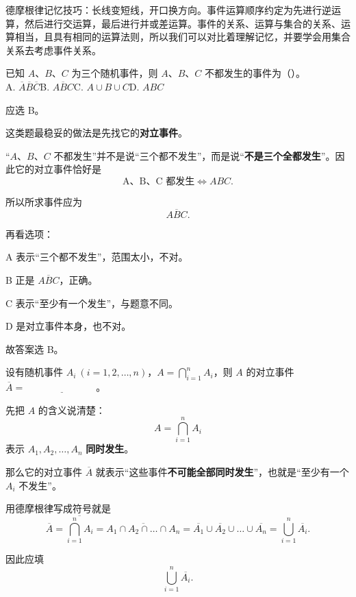 ﻿\documentclass[lang=cn,11pt]{elegantbook}
\begin{document}
\begin{note}
德摩根律记忆技巧：长线变短线，开口换方向。事件运算顺序约定为先进行逆运算，然后进行交运算，最后进行并或差运算。事件的关系、运算与集合的关系、运算相当，且具有相同的运算法则，所以我们可以对比着理解记忆，并要学会用集合关系去考虑事件关系。
\end{note}

\begin{exercise}\label{exer:1-1}
已知 \(A\)、\(B\)、\(C\) 为三个随机事件，则 \(A\)、\(B\)、\(C\) 不都发生的事件为（\quad ）。\\
A. $\overline{A}\overline{B}\overline{C}$\quad B. $\overline{ABC}$\quad C. $A \cup B \cup C$\quad D. $ABC$
\end{exercise}

\begin{solution}
应选 B。

这类题最稳妥的做法是先找它的\textbf{对立事件}。

“\(A\)、\(B\)、\(C\) 不都发生”并不是说“三个都不发生”，而是说“\textbf{不是三个全都发生}”。因此它的对立事件恰好是
\[
\text{A、B、C 都发生} \Longleftrightarrow ABC.
\]

所以所求事件应为
\[
\overline{ABC}.
\]

再看选项：

A 表示“三个都不发生”，范围太小，不对。

B 正是 \(\overline{ABC}\)，正确。

C 表示“至少有一个发生”，与题意不同。

D 是对立事件本身，也不对。

故答案选 B。
\end{solution}

\begin{exercise}\label{exer:1-2}
设有随机事件 \(A_i\ (i=1,2,\dots,n)\)，\(A = \bigcap_{i=1}^{n} A_i\)，则 \(A\) 的对立事件 \(\overline{A} =\ \underline{\hspace{3cm}}\)。
\end{exercise}

\begin{solution}
先把 \(A\) 的含义说清楚：
\[
A=\bigcap_{i=1}^{n}A_i
\]
表示 \(A_1,A_2,\dots,A_n\) \textbf{同时发生}。

那么它的对立事件 \(\overline A\) 就表示“这些事件\textbf{不可能全部同时发生}”，也就是“至少有一个 \(A_i\) 不发生”。

用德摩根律写成符号就是
\[
\overline{A} = \overline{\bigcap_{i=1}^{n} A_i} = \overline{A_1 \cap A_2 \cap \dots \cap A_n} = \overline{A_1} \cup \overline{A_2} \cup \dots \cup \overline{A_n} = \bigcup_{i=1}^{n} \overline{A_i}.
\]

因此应填
\[
\bigcup_{i=1}^{n}\overline{A_i}.
\]
\end{solution}
\end{document}
